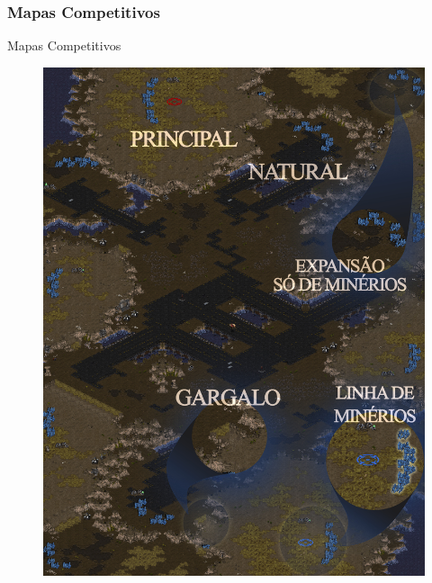 \documentclass{beamer}
\begin{document}
\subsubsection{Mapas Competitivos}
\begin{frame}{Mapas Competitivos}
\begin{figure}
  \centering
  \includegraphics[scale=0.06]{Imagens/mapa-tudo.jpg}
\end{figure}
\end{frame}
\end{document}
